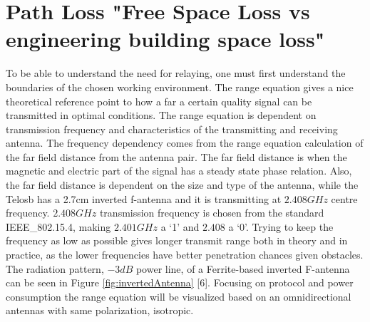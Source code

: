 \section{Path Loss "Free Space Loss vs engineering building space loss"}\label{sc:pathLoss}
To be able to understand the need for relaying, one must first understand the boundaries of the chosen working environment. The range equation gives a nice theoretical reference point to how a far a certain quality signal can be transmitted in optimal conditions. The range equation is dependent on transmission frequency and characteristics of the transmitting and receiving antenna. The frequency dependency comes from the range equation calculation of the far field distance from the antenna pair. The far field distance is when the magnetic and electric part of the signal has a steady state phase relation. Also, the far field distance is dependent on the size and type of the antenna, while the Telosb has a 2.7cm inverted f-antenna and it is transmitting at $2.408GHz$ centre frequency. $2.408GHz$ transmission frequency is chosen from the standard IEEE\_802.15.4, making $2.401GHz$ a ‘1’ and $2.408$ a ‘0’. Trying to keep the frequency as low as possible gives longer transmit range both in theory and in practice, as the lower frequencies have better penetration chances given obstacles. The radiation pattern, $-3dB$ power line, of a Ferrite-based inverted F-antenna can be seen in Figure \ref{fig:invertedAntenna} [6]. Focusing on protocol and power consumption the range equation will be visualized based on an omnidirectional antennas with same polarization, isotropic.

